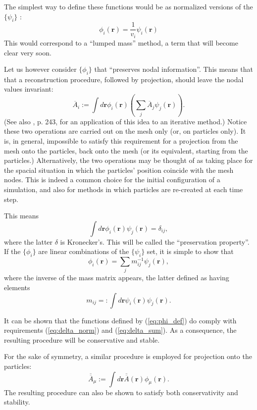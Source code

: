 \documentclass{ws-ijcm}
\newcommand{\bfr}{\mathbf{r}}
\newcommand*{\Ab}{\overline{A}}
\newcommand*{\Abb}{\overline{\overline{A}}}
\begin{document}
The simplest way to define these functions would be as normalized
versions of the $\{ \psi_i \}$ :
\begin{equation}
\label{eq:lumped}
  \phi_i(\bfr) = \frac1{v_i}  \psi_i(\bfr) 
\end{equation}
This would correspond to a ``lumped mass'' method, a term that will
become clear very soon.

Let us however consider $\{\phi_i\}$ that ``preserves nodal
information''. This means that that a reconstruction procedure,
followed by projection, should leave the nodal values invariant:
\begin{equation*}
\Ab_i :=  \int d\bfr  \phi_i(\bfr) \left(\sum_j \Ab_j \psi_j(\bfr) \right) .
\end{equation*}
(See also \cite{cottet2000} , p. 243, for an application of this
idea to an iterative method.)  Notice these two operations are carried
out on the mesh only (or, on particles only). It is, in general,
impossible to satisfy this requirement for a projection from the mesh
onto the particles, back onto the mesh (or its equivalent, starting
from the particles.) Alternatively, the two operations may be thought
of as taking place for the spacial situation in which the particles'
position coincide with the mesh nodes. This is indeed a common choice
for the initial configuration of a simulation, and also for methods in
which particles are re-created at each time step.

This means
\begin{equation}
\label{eq:ortho}
\int d\bfr \phi_i(\bfr) \psi_j(\bfr) = \delta_{ij} ,
\end{equation}
where the latter $\delta$ is Kronecker's. This will be called the
``preservation property''.  If the $\{\phi_i\}$ are linear
combinations of the $\{\psi_i\}$ set, it is simple to show that
\begin{equation}
\label{eq:phi_def}
\phi_i(\bfr) = \sum_j m_{ij}^{-1} \psi_j(\bfr) ,
\end{equation}
where the inverse of the mass matrix appears, the latter defined as
having elements
\[
m_{ij} =:  \int d\bfr  \psi_i(\bfr)   \psi_j(\bfr) .
\]

It can be shown that the functions defined by (\ref{eq:phi_def}) do
comply with requirements (\ref{eq:delta_norm}) and
(\ref{eq:delta_sum}). As a consequence, the resulting procedure will
be conservative and stable.

For the sake of symmetry, a similar procedure is employed for
projection onto the particles:
\begin{equation}
\label{eq:proj2}
\Abb_\mu :=  \int d\bfr \Abb(\bfr) \phi_\mu(\bfr) .
\end{equation}
The resulting procedure can also be shown to satisfy both
conservativity and stability.
\end{document}
